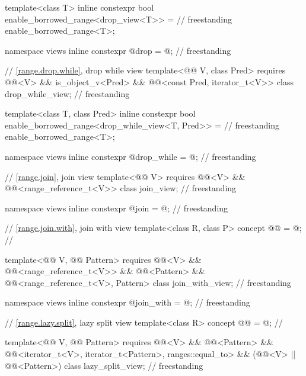 \begin{codeblock}
{  template<class T>
    inline constexpr bool enable_borrowed_range<drop_view<T>> =                     // freestanding
      enable_borrowed_range<T>;

  namespace views { inline constexpr @\unspecnc@ drop = @\unspecnc@; }              // freestanding

  // \ref{range.drop.while}, drop while view
  template<@@ V, class Pred>
    requires @@<V> && is_object_v<Pred> &&
             @@<const Pred, iterator_t<V>>
    class drop_while_view;                                                          // freestanding

  template<class T, class Pred>
    inline constexpr bool enable_borrowed_range<drop_while_view<T, Pred>> =         // freestanding
      enable_borrowed_range<T>;

  namespace views { inline constexpr @\unspecnc@ drop_while = @\unspecnc@; }        // freestanding

  // \ref{range.join}, join view
  template<@@ V>
    requires @@<V> && @@<range_reference_t<V>>
  class join_view;                                                                  // freestanding

  namespace views { inline constexpr @\unspecnc@ join = @\unspecnc@; }              // freestanding

  // \ref{range.join.with}, join with view
  template<class R, class P>
    concept @@ = @\seebelow@; // \expos

  template<@@ V, @@ Pattern>
    requires @@<V> && @@<range_reference_t<V>>
          && @@<Pattern>
          && @@<range_reference_t<V>, Pattern>
  class join_with_view;                                                             // freestanding

  namespace views { inline constexpr @\unspecnc@ join_with = @\unspecnc@; }         // freestanding

  // \ref{range.lazy.split}, lazy split view
  template<class R>
    concept @@ = @\seebelow@;   // \expos

  template<@@ V, @@ Pattern>
    requires @@<V> && @@<Pattern> &&
             @@<iterator_t<V>, iterator_t<Pattern>, ranges::equal_to> &&
             (@@<V> || @@<Pattern>)
  class lazy_split_view;                                                            // freestanding

}
\end{codeblock}
